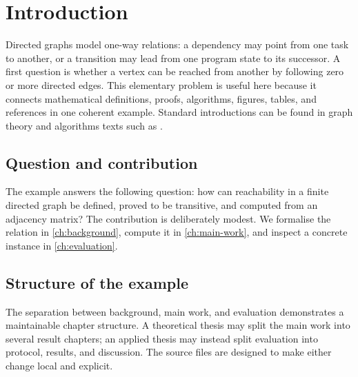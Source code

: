\chapter{Introduction}
\label{ch:introduction}


Directed graphs model one-way relations: a dependency may point from one task
to another, or a transition may lead from one program state to its successor.
A first question is whether a vertex can be reached from another by following
zero or more directed edges. This elementary problem is useful here because it
connects mathematical definitions, proofs, algorithms, figures, tables, and
references in one coherent example. Standard introductions can be found in
graph theory and algorithms texts such as \cite{diestel2017,cormen2022}.

\section{Question and contribution}

The example answers the following question: how can reachability in a finite
directed graph be defined, proved to be transitive, and computed from an
adjacency matrix? The contribution is deliberately modest. We formalise the
relation in \cref{ch:background}, compute it in \cref{ch:main-work}, and inspect
a concrete instance in \cref{ch:evaluation}.

\section{Structure of the example}

The separation between background, main work, and evaluation demonstrates a
maintainable chapter structure. A theoretical thesis may split the main work
into several result chapters; an applied thesis may instead split evaluation
into protocol, results, and discussion. The source files are designed to make
either change local and explicit.
